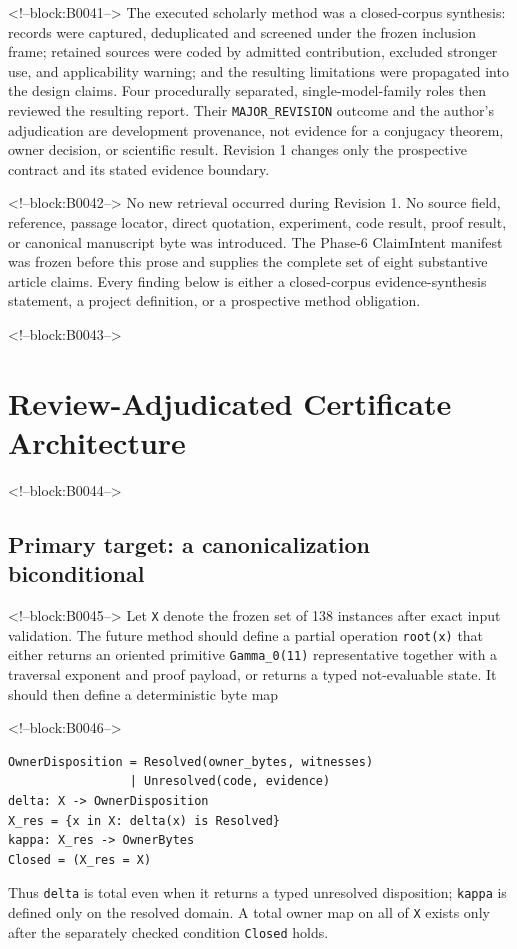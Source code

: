 \documentclass[11pt]{article}
\begin{document}
<!--block:B0041-->
The executed scholarly method was a closed-corpus synthesis: records were
captured, deduplicated and screened under the frozen inclusion frame; retained
sources were coded by admitted contribution, excluded stronger use, and
applicability warning; and the resulting limitations were propagated into the
design claims. Four procedurally separated, single-model-family roles then
reviewed the resulting report. Their \texttt{MAJOR\_REVISION} outcome and the
author's adjudication are development provenance, not evidence for a conjugacy
theorem, owner decision, or scientific result. Revision 1 changes only the
prospective contract and its stated evidence boundary.

<!--block:B0042-->
No new retrieval occurred during Revision 1. No source field, reference,
passage locator, direct quotation, experiment, code result, proof
result, or canonical manuscript byte was introduced. The Phase-6
ClaimIntent manifest was frozen before this prose and supplies the
complete set of eight substantive article claims. Every finding below is
either a closed-corpus evidence-synthesis statement, a project
definition, or a prospective method obligation.

<!--block:B0043-->
\hypertarget{4-review-adjudicated-certificate-architecture}{%
\section{Review-Adjudicated Certificate
Architecture}\label{4-review-adjudicated-certificate-architecture}}

<!--block:B0044-->
\hypertarget{41-primary-target-a-canonicalization-biconditional}{%
\subsection{Primary target: a canonicalization
biconditional}\label{41-primary-target-a-canonicalization-biconditional}}

<!--block:B0045-->
Let \texttt{X} denote the frozen set of 138 instances after exact input
validation. The future method should define a partial operation
\texttt{root(x)} that either returns an oriented primitive
\texttt{Gamma\_0(11)} representative together with a traversal exponent
and proof payload, or returns a typed not-evaluable state. It should
then define a deterministic byte map

<!--block:B0046-->
\begin{verbatim}
OwnerDisposition = Resolved(owner_bytes, witnesses)
                 | Unresolved(code, evidence)
delta: X -> OwnerDisposition
X_res = {x in X: delta(x) is Resolved}
kappa: X_res -> OwnerBytes
Closed = (X_res = X)
\end{verbatim}
Thus \texttt{delta} is total even when it returns a typed unresolved disposition;
\texttt{kappa} is defined only on the resolved domain.  A total owner map on all
of \texttt{X} exists only after the separately checked condition
\texttt{Closed} holds.
\end{document}
